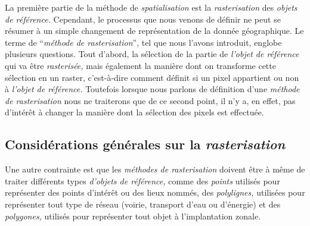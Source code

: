 La première partie de la méthode de \emph{spatialisation} est la
\emph{rasterisation} des \emph{objets de référence.} Cependant, le
processus que nous venons de définir ne peut se résumer à un simple
changement de représentation de la donnée géographique. Le terme de
\enquote{\emph{méthode de rasterisation}}, tel que nous l'avons
introduit, englobe plusieurs questions. Tout d'abord, la sélection de
la partie de \emph{l'objet de référence} qui va être
\emph{rasterisée,} mais également la manière dont on transforme cette
sélection en un raster, c'est-à-dire comment définit si un pixel
appartient ou non à \emph{l'objet de référence.} Toutefois lorsque
nous parlons de définition d'une \emph{méthode de rasterisation} nous
ne traiterons que de ce second point, il n'y a, en effet, pas
d’intérêt à changer la manière dont la sélection des pixels est
effectuée.

\subsection{Considérations générales sur la \emph{rasterisation}}


Une autre contrainte est que les \emph{méthodes de rasterisation}
doivent être à même de traiter différents types \emph{d'objets de
  référence,} comme des \emph{points} utilisés pour représenter des
points d’intérêt ou des lieux nommés, des \emph{polylignes,} utilisées
pour représenter tout type de réseau (\eg voirie, transport d'eau ou
d'énergie) et des \emph{polygones,} utilisés pour représenter tout
objet à l’implantation zonale.

